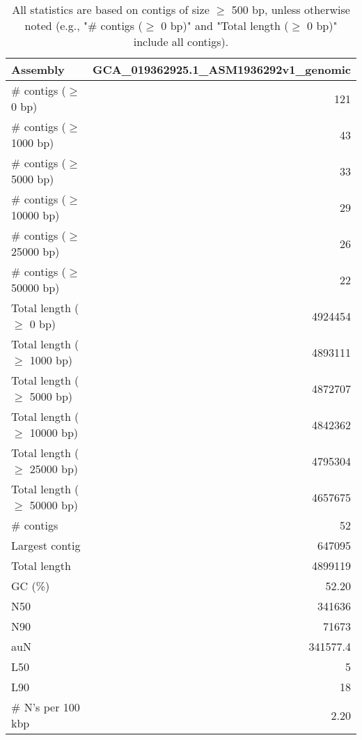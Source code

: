 \documentclass[12pt,a4paper]{article}
\begin{document}
\begin{table}[ht]
\begin{center}
\caption{All statistics are based on contigs of size $\geq$ 500 bp, unless otherwise noted (e.g., "\# contigs ($\geq$ 0 bp)" and "Total length ($\geq$ 0 bp)" include all contigs).}
\begin{tabular}{|l*{1}{|r}|}
\hline
Assembly & GCA\_019362925.1\_ASM1936292v1\_genomic \\ \hline
\# contigs ($\geq$ 0 bp) & 121 \\ \hline
\# contigs ($\geq$ 1000 bp) & 43 \\ \hline
\# contigs ($\geq$ 5000 bp) & 33 \\ \hline
\# contigs ($\geq$ 10000 bp) & 29 \\ \hline
\# contigs ($\geq$ 25000 bp) & 26 \\ \hline
\# contigs ($\geq$ 50000 bp) & 22 \\ \hline
Total length ($\geq$ 0 bp) & 4924454 \\ \hline
Total length ($\geq$ 1000 bp) & 4893111 \\ \hline
Total length ($\geq$ 5000 bp) & 4872707 \\ \hline
Total length ($\geq$ 10000 bp) & 4842362 \\ \hline
Total length ($\geq$ 25000 bp) & 4795304 \\ \hline
Total length ($\geq$ 50000 bp) & 4657675 \\ \hline
\# contigs & 52 \\ \hline
Largest contig & 647095 \\ \hline
Total length & 4899119 \\ \hline
GC (\%) & 52.20 \\ \hline
N50 & 341636 \\ \hline
N90 & 71673 \\ \hline
auN & 341577.4 \\ \hline
L50 & 5 \\ \hline
L90 & 18 \\ \hline
\# N's per 100 kbp & 2.20 \\ \hline
\end{tabular}
\end{center}
\end{table}
\end{document}
